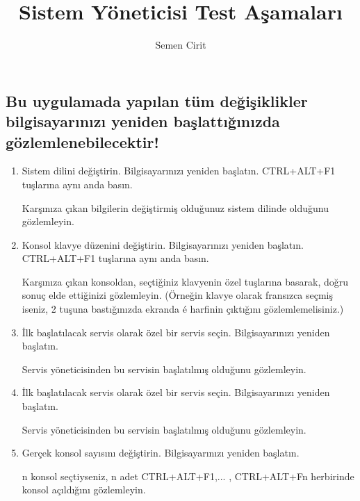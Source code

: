 \documentclass[a4paper,10pt]{article}
\title{Sistem Yöneticisi Test Aşamaları}
\author{Semen Cirit}
\begin{document}
\maketitle

\subsection*{Bu uygulamada yapılan tüm değişiklikler bilgisayarınızı yeniden başlattığınızda gözlemlenebilecektir!}
\begin{enumerate}
\item  Sistem dilini değiştirin. Bilgisayarınızı yeniden başlatın. CTRL+ALT+F1 tuşlarına aynı anda basın.

	Karşınıza çıkan bilgilerin değiştirmiş olduğunuz sistem dilinde olduğunu gözlemleyin.

\item  Konsol klavye düzenini değiştirin. Bilgisayarınızı yeniden başlatın. CTRL+ALT+F1 tuşlarına aynı anda basın.

	Karşınıza çıkan konsoldan, seçtiğiniz klavyenin özel tuşlarına basarak, doğru sonuç elde ettiğinizi gözlemleyin. (Örneğin klavye olarak fransızca seçmiş iseniz, 2 tuşuna bastığınızda ekranda é harfinin çıktığını gözlemlemelisiniz.)

\item  İlk başlatılacak servis olarak özel bir servis seçin. Bilgisayarınızı yeniden başlatın.

	Servis yöneticisinden bu servisin başlatılmış olduğunu gözlemleyin.

\item  İlk başlatılacak servis olarak özel bir servis seçin. Bilgisayarınızı yeniden başlatın.

	Servis yöneticisinden bu servisin başlatılmış olduğunu gözlemleyin.

\item Gerçek konsol sayısını değiştirin. Bilgisayarınızı yeniden başlatın.

	n konsol seçtiyseniz, n adet CTRL+ALT+F1,... ,  CTRL+ALT+Fn herbirinde konsol açıldığını gözlemleyin.
\end{enumerate}
\end{document}
